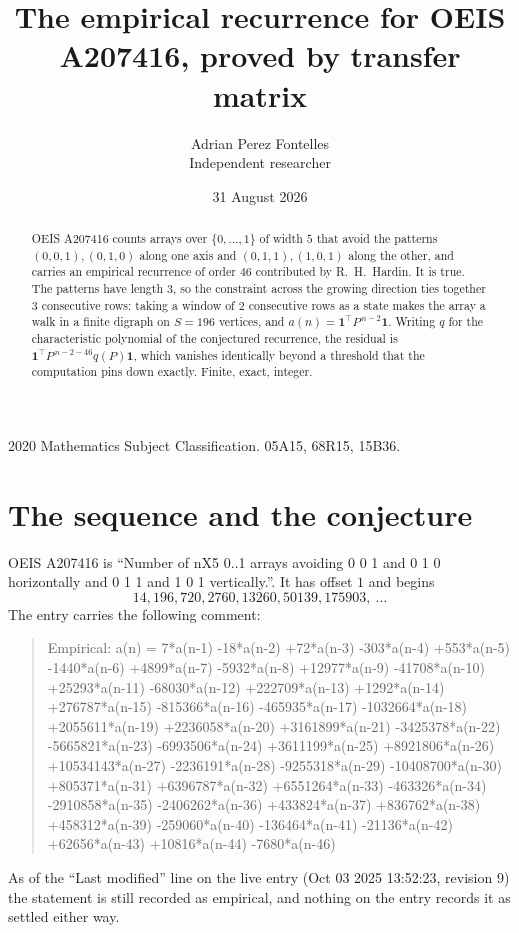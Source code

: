 \documentclass[11pt,a4paper]{article}
\title{The empirical recurrence for OEIS A207416, proved by transfer matrix}
\author{Adrian Perez Fontelles\\ \small Independent researcher}
\date{31 August 2026}
\theoremstyle{plain}
\theoremstyle{definition}
\begin{document}
\maketitle

\begin{abstract}
OEIS A207416 counts arrays over $\{0,\dots,1\}$ of width $5$ that avoid the patterns
$(0,0,1), (0,1,0)$ along one axis and $(0,1,1), (1,0,1)$ along the other, and carries an empirical recurrence of
order $46$ contributed by R.~H.~Hardin. It is true. The patterns have length $3$, so
the constraint across the growing direction ties together $3$ consecutive rows: taking a
window of $2$ consecutive rows as a state makes the array a walk in a finite digraph
on $S=196$ vertices, and $a(n)=\mathbf{1}^{\!\top}P^{\,n-2}\mathbf{1}$. Writing $q$
for the characteristic polynomial of the conjectured recurrence, the residual is
$\mathbf{1}^{\!\top}P^{\,n-2-46}q(P)\mathbf{1}$, which vanishes identically
beyond a threshold that the computation pins down exactly. Finite, exact, integer.
\end{abstract}

\noindent\small 2020 Mathematics Subject Classification. 05A15, 68R15, 15B36.\normalsize

\section{The sequence and the conjecture}

OEIS A207416 is ``Number of nX5 0..1 arrays avoiding 0 0 1 and 0 1 0 horizontally and 0 1 1 and 1 0 1 vertically.''. It has offset
$1$ and begins
\[
14, 196, 720, 2760, 13260, 50139, 175903,\ \dots
\]
The entry carries the following comment:
\begin{quote}\small
Empirical: a(n) = 7*a(n-1) -18*a(n-2) +72*a(n-3) -303*a(n-4) +553*a(n-5) -1440*a(n-6) +4899*a(n-7) -5932*a(n-8) +12977*a(n-9) -41708*a(n-10) +25293*a(n-11) -68030*a(n-12) +222709*a(n-13) +1292*a(n-14) +276787*a(n-15) -815366*a(n-16) -465935*a(n-17) -1032664*a(n-18) +2055611*a(n-19) +2236058*a(n-20) +3161899*a(n-21) -3425378*a(n-22) -5665821*a(n-23) -6993506*a(n-24) +3611199*a(n-25) +8921806*a(n-26) +10534143*a(n-27) -2236191*a(n-28) -9255318*a(n-29) -10408700*a(n-30) +805371*a(n-31) +6396787*a(n-32) +6551264*a(n-33) -463326*a(n-34) -2910858*a(n-35) -2406262*a(n-36) +433824*a(n-37) +836762*a(n-38) +458312*a(n-39) -259060*a(n-40) -136464*a(n-41) -21136*a(n-42) +62656*a(n-43) +10816*a(n-44) -7680*a(n-46)
\end{quote}
As of the ``Last modified'' line on the live entry (Oct 03 2025 13:52:23, revision
9) the statement is still recorded as empirical, and nothing on the entry
records it as settled either way.
\end{document}
